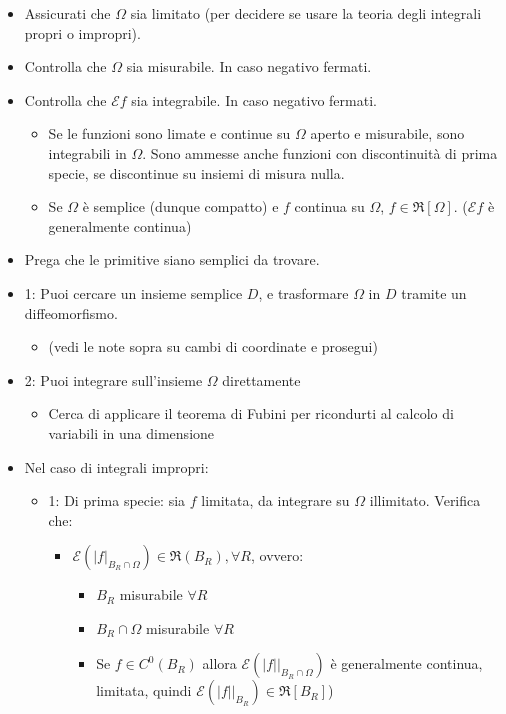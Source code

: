 \documentclass[a4paper,12pt]{book}
\begin{document}
\begin{itemize}
 \item Assicurati che $\Omega$ sia limitato (per decidere se usare la teoria degli integrali propri o impropri).
 \item Controlla che $\Omega$ sia misurabile. In caso negativo fermati.
 \item Controlla che $\mathcal{E}f$ sia integrabile. In caso negativo fermati.
 \begin{itemize}
  \item Se le funzioni sono limate e continue su $\Omega$ aperto e misurabile, sono integrabili in $\Omega$. Sono ammesse anche funzioni con discontinuità di prima specie, se discontinue su insiemi di misura nulla.
  \item Se $\Omega$ è semplice (dunque compatto) e $f$ continua su $\Omega$, $f\in\Re[\Omega]$. ($\mathcal{E}f$ è generalmente continua)
 \end{itemize}
 \item Prega che le primitive siano semplici da trovare.
 \item 1: Puoi cercare un insieme semplice $D$, e trasformare $\Omega$ in $D$ tramite un diffeomorfismo.
 \begin{itemize}
  \item (vedi le note sopra su cambi di coordinate e prosegui)
 \end{itemize}
 \item 2: Puoi integrare sull'insieme $\Omega$ direttamente
 \begin{itemize}
  \item Cerca di applicare il teorema di Fubini per ricondurti al calcolo di variabili in una dimensione
 \end{itemize}
 \item Nel caso di integrali impropri:
 \begin{itemize}
  \item 1: Di prima specie: sia $f$ limitata, da integrare su $\Omega$ illimitato. Verifica che:
  \begin{itemize}
   \item $\mathcal{E}(|f|_{B_R\cap\Omega}) \in \Re(B_R), \forall R$, ovvero:
   \begin{itemize}
    \item $B_R$ misurabile $\forall R$
    \item $B_R\cap\Omega$ misurabile $\forall R$
    \item Se $f \in C^0(B_R)$ allora $\mathcal{E}(|f||_{B_R\cap\Omega})$ è generalmente continua, limitata, quindi $\mathcal{E}(|f||_{B_R}) \in \Re[B_R]$)

\end{itemize}
\end{itemize}
\end{itemize}
\end{itemize}
\end{document}
